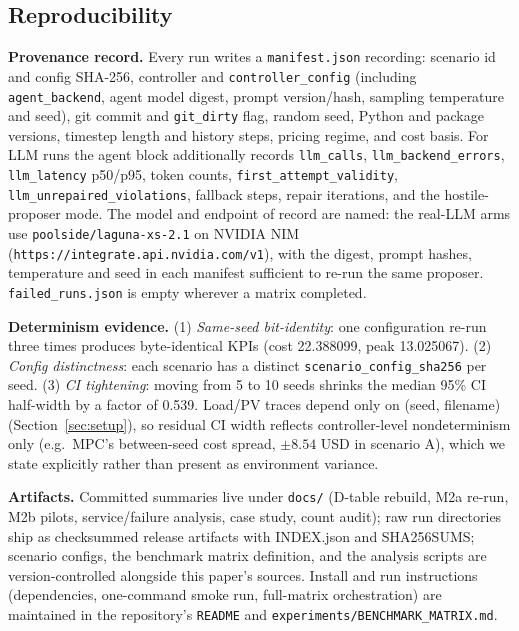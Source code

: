 \documentclass[11pt,a4paper]{article}
\begin{document}
\subsection{Reproducibility}
\label{sec:repro}

\textbf{Provenance record.} Every run writes a \texttt{manifest.json} recording:
scenario id and config SHA-256, controller and \texttt{controller\_config}
(including \texttt{agent\_backend}, agent model digest, prompt version/hash,
sampling temperature and seed), git commit and \texttt{git\_dirty} flag, random
seed, Python and package versions, timestep length and history steps, pricing
regime, and cost basis. For LLM runs the agent block additionally records
\texttt{llm\_calls}, \texttt{llm\_backend\_errors}, \texttt{llm\_latency}
p50/p95, token counts, \texttt{first\_attempt\_validity},
\texttt{llm\_unrepaired\_violations}, fallback steps, repair iterations, and the
hostile-proposer mode. The model and endpoint of record are named: the
real-LLM arms use \texttt{poolside/laguna-xs-2.1} on NVIDIA NIM
(\texttt{https://integrate.api.nvidia.com/v1}), with the digest, prompt
hashes, temperature and seed in each manifest sufficient to re-run the same
proposer. \texttt{failed\_runs.json} is empty
wherever a matrix completed.

\textbf{Determinism evidence.} (1) \emph{Same-seed bit-identity}: one
configuration re-run three times produces byte-identical KPIs (cost
22.388099, peak 13.025067). (2) \emph{Config distinctness}: each scenario has a
distinct \texttt{scenario\_config\_sha256} per seed. (3) \emph{CI tightening}:
moving from 5 to 10 seeds shrinks the median 95\% CI half-width by a factor of
0.539. Load/PV traces depend only on (seed, filename)
(Section~\ref{sec:setup}), so residual CI width reflects controller-level
nondeterminism only (e.g.\ MPC's between-seed cost spread, $\pm 8.54$ USD in
scenario A), which we state explicitly rather than present as environment
variance.

\textbf{Artifacts.} Committed summaries live under \texttt{docs/} (D-table
rebuild, M2a re-run, M2b pilots, service/failure analysis, case study, count
audit); raw run directories ship as checksummed release artifacts with
INDEX.json and SHA256SUMS; scenario configs, the benchmark matrix definition,
and the analysis scripts are version-controlled alongside this paper's sources.
Install and run instructions (dependencies, one-command smoke run, full-matrix
orchestration) are maintained in the repository's \texttt{README} and
\texttt{experiments/BENCHMARK\_MATRIX.md}.
\end{document}
